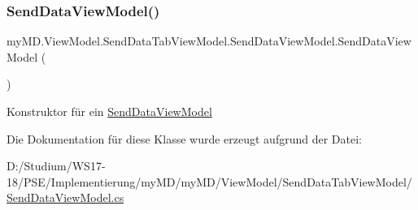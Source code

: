 \subsubsection{\texorpdfstring{Send\+Data\+View\+Model()}{SendDataViewModel()}}
{\footnotesize\ttfamily my\+M\+D.\+View\+Model.\+Send\+Data\+Tab\+View\+Model.\+Send\+Data\+View\+Model.\+Send\+Data\+View\+Model (\begin{DoxyParamCaption}{ }\end{DoxyParamCaption})}



Konstruktor für ein \mbox{\hyperlink{classmy_m_d_1_1_view_model_1_1_send_data_tab_view_model_1_1_send_data_view_model}{Send\+Data\+View\+Model}} 



Die Dokumentation für diese Klasse wurde erzeugt aufgrund der Datei\+:\begin{DoxyCompactItemize}
\item 
D\+:/\+Studium/\+W\+S17-\/18/\+P\+S\+E/\+Implementierung/my\+M\+D/my\+M\+D/\+View\+Model/\+Send\+Data\+Tab\+View\+Model/\mbox{\hyperlink{_send_data_view_model_8cs}{Send\+Data\+View\+Model.\+cs}}\end{DoxyCompactItemize}

